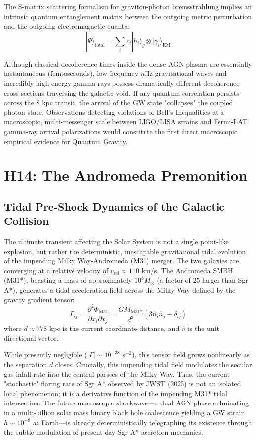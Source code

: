 \documentclass[12pt,a4paper]{article}
\begin{document}
The S-matrix scattering formalism for graviton-photon bremsstrahlung implies an intrinsic quantum entanglement matrix between the outgoing metric perturbation and the outgoing electromagnetic quanta:
\begin{equation}
    |\Psi\rangle_{\text{total}} = \sum_i c_i |h_i\rangle_g \otimes |\gamma_i\rangle_{\text{EM}}
\end{equation}

Although classical decoherence times inside the dense AGN plasma are essentially instantaneous (femtoseconds), low-frequency $n$Hz gravitational waves and incredibly high-energy gamma-rays possess dramatically different decoherence cross-sections traversing the galactic void. If any quantum correlation persists across the 8 kpc transit, the arrival of the GW state "collapses" the coupled photon state. Observations detecting violations of Bell's Inequalities at a macroscopic, multi-messenger scale between LIGO/LISA strains and Fermi-LAT gamma-ray arrival polarizations would constitute the first direct macroscopic empirical evidence for Quantum Gravity. 

\section{H14: The Andromeda Premonition}
\subsection{Tidal Pre-Shock Dynamics of the Galactic Collision}

The ultimate transient affecting the Solar System is not a single point-like explosion, but rather the deterministic, inescapable gravitational tidal evolution of the impending Milky Way-Andromeda (M31) merger. The two galaxies are converging at a relative velocity of $v_{\text{rel}} \approx 110$ km/s. The Andromeda SMBH (M31*), boasting a mass of approximately $10^8 M_\odot$ (a factor of $25$ larger than Sgr A*), generates a tidal acceleration field across the Milky Way defined by the gravity gradient tensor:
\begin{equation}
    \Gamma_{ij} = \frac{\partial^2 \Phi_{\text{M31}}}{\partial x_i \partial x_j} = \frac{G M_{\text{M31*}}}{d^3} \left( 3 \hat{n}_i \hat{n}_j - \delta_{ij} \right)
\end{equation}
where $d \approx 778$ kpc is the current coordinate distance, and $\hat{n}$ is the unit directional vector. 

While presently negligible ($|\Gamma| \sim 10^{-38}$ s$^{-2}$), this tensor field grows nonlinearly as the separation $d$ closes. Crucially, this impending tidal field modulates the secular gas infall rate into the central parsecs of the Milky Way. Thus, the current "stochastic" flaring rate of Sgr A* observed by JWST (2025) is not an isolated local phenomenon; it is a derivative function of the impending M31* tidal intersection. The future macroscopic shockwave—a dual AGN phase culminating in a multi-billion solar mass binary black hole coalescence yielding a GW strain $h \sim 10^{-8}$ at Earth—is already deterministically telegraphing its existence through the subtle modulation of present-day Sgr A* accretion mechanics.
\end{document}
